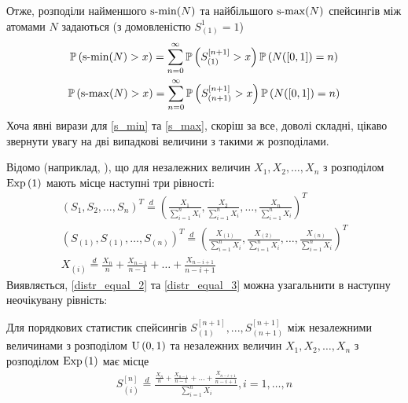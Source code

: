 Отже, розподіли найменшого $\operatorname{s-min}(N)$ та найбільшого $\operatorname{s-max}(N)$ спейсингів 
між атомами $N$ задаються
(з домовленістю $S_{(1)}^{1} = 1$)
\begin{gather}
    \label{s_min}
    \mathbb{P}\left(\operatorname{s-min}(N) > x\right) = 
    \sum_{n=0}^{\infty} \mathbb{P}\left(S_{(1)}^{[n+1]} > x\right) \mathbb{P}\left(N([0, 1]) = n\right) \\
    \label{s_max}
    \mathbb{P}\left(\operatorname{s-max}(N) > x\right) = 
    \sum_{n=0}^{\infty} \mathbb{P}\left(S_{(n+1)}^{[n+1]} > x\right) \mathbb{P}\left(N([0, 1]) = n\right)
\end{gather}
Хоча явні вирази для \eqref{s_min} та \eqref{s_max},
скоріш за все, доволі складні, цікаво звернути увагу на дві випадкові величини
з такими ж розподілами.

Відомо (наприклад, \cite{Holst_1980}), що для незалежних величин 
$X_1, X_2, \dots, X_{n}$ з розподілом $\mathrm{Exp}\left(1\right)$
мають місце наступні три рівності:
\begin{gather}
    \label{distr_equal_1}
    \left(
        S_1, S_2, \dots, S_{n}
    \right)^T
    \overset{d}{=}
    \left(
        \frac{X_1}{\sum_{i=1}^{n}X_i},
        \frac{X_2}{\sum_{i=1}^{n}X_i},
        \dots,
        \frac{X_{n}}{\sum_{i=1}^{n}X_i}
    \right)^T \\
    \label{distr_equal_2}
    \left(
        S_{(1)}, S_{(1)}, \dots, S_{(n)}
    \right)^T
    \overset{d}{=}
    \left(
        \frac{X_{(1)}}{\sum_{i=1}^{n}X_i},
        \frac{X_{(2)}}{\sum_{i=1}^{n}X_i},
        \dots,
        \frac{X_{(n)}}{\sum_{i=1}^{n}X_i}
    \right)^T \\
    \label{distr_equal_3}
    X_{(i)} \overset{d}{=}
    \frac{X_n}{n} + \frac{X_{n-1}}{n-1} + \dots + \frac{X_{n-i+1}}{n-i+1}
\end{gather}
Виявляється, \eqref{distr_equal_2} та \eqref{distr_equal_3}
можна узагальнити в наступну неочікувану рівність:
\begin{lemma}\label{distr_equal}
    Для порядкових статистик спейсингів 
    $S_{(1)}^{[n+1]}, ..., S_{(n+1)}^{[n+1]}$
    між незалежними величинами з розподілом $\mathrm{U}\left(0, 1\right)$
    та незалежних величин 
    $X_1, X_2, \dots, X_{n}$ з розподілом $\mathrm{Exp}\left(1\right)$ має місце
    \begin{gather}\label{distr_equal_4}
        S_{(i)}^{[n]} \overset{d}{=}
        \frac{
            \frac{X_n}{n} + \frac{X_{n-1}}{n-1} + \dots + \frac{X_{n-i+1}}{n-i+1}
        }{
            \sum_{i=1}^{n}X_i
        }, i = 1, \dots, n
    \end{gather}
\end{lemma}
